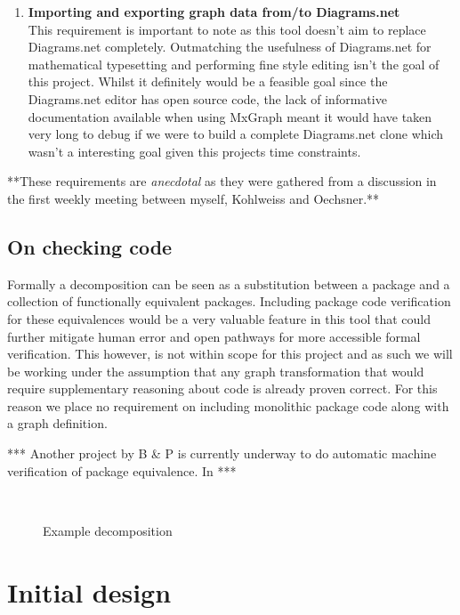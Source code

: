 \documentclass[bsc,frontabs,singlespacing,parskip,deptreport]{infthesis}
\begin{document}
\begin{enumerate}
    \item \textbf{Importing and exporting graph data from/to Diagrams.net}\\
    This requirement is important to note as this tool doesn't aim to replace Diagrams.net completely. Outmatching the usefulness of Diagrams.net for mathematical typesetting and performing fine style editing isn't the goal of this project. Whilst it definitely would be a feasible goal since the Diagrams.net editor has open source code, the lack of informative documentation available when using MxGraph meant it would have taken very long to debug if we were to build a complete Diagrams.net clone which wasn't a interesting goal given this projects time constraints.     
\end{enumerate}

**These requirements are \textit{anecdotal} as they were gathered from a discussion in the first weekly meeting between myself, Kohlweiss and Oechsner.**   


\subsection{On checking code}
Formally a decomposition can be seen as a substitution between a package and a collection of functionally equivalent packages. Including package code verification for these equivalences would be a very valuable feature in this tool that could further mitigate human error and open pathways for more accessible formal verification. This however, is not within scope for this project and as such we will be working under the assumption that any graph transformation that would require supplementary reasoning about code is already proven correct. For this reason we place no requirement on including monolithic package code along with a graph definition.    

*** Another project by B \& P is currently underway to do automatic machine verification of package equivalence. In ***


    \begin{figure}[h!]
        \centering
        \vspace{1em}\\
        \caption{Example decomposition}
        \label{fig:decomp}
    \end{figure}
    

\section{Initial design}
\end{document}
